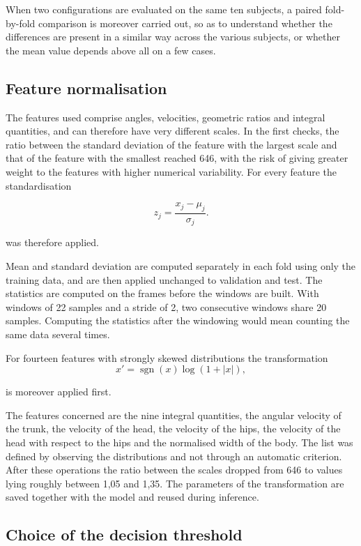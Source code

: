 When two configurations are evaluated on the same ten subjects, a paired fold-by-fold comparison is moreover carried out, so as to understand whether the differences are present in a similar way across the various subjects, or whether the mean value depends above all on a few cases.

\subsection{Feature normalisation}
\label{sec:normalizzazione}

The features used comprise angles, velocities, geometric ratios and integral quantities, and can therefore have very different scales. In the first checks, the ratio between the standard deviation of the feature with the largest scale and that of the feature with the smallest reached 646, with the risk of giving greater weight to the features with higher numerical variability. For every feature the standardisation

\[
z_j =
\frac{x_j-\mu_j}{\sigma_j}.
\]

was therefore applied.

Mean and standard deviation are computed separately in each fold using only the training data, and are then applied unchanged to validation and test. The statistics are computed on the frames before the windows are built. With windows of 22 samples and a stride of 2, two consecutive windows share 20 samples. Computing the statistics after the windowing would mean counting the same data several times.

For fourteen features with strongly skewed distributions the transformation
\[
x' = \operatorname{sgn}(x)\log(1+|x|),
\]

is moreover applied first.

The features concerned are the nine integral quantities, the angular velocity of the trunk, the velocity of the head, the velocity of the hips, the velocity of the head with respect to the hips and the normalised width of the body. The list was defined by observing the distributions and not through an automatic criterion.
After these operations the ratio between the scales dropped from 646 to values lying roughly between 1,05 and 1,35. The parameters of the transformation are saved together with the model and reused during inference.

\subsection{Choice of the decision threshold}
\label{sec:soglia}

